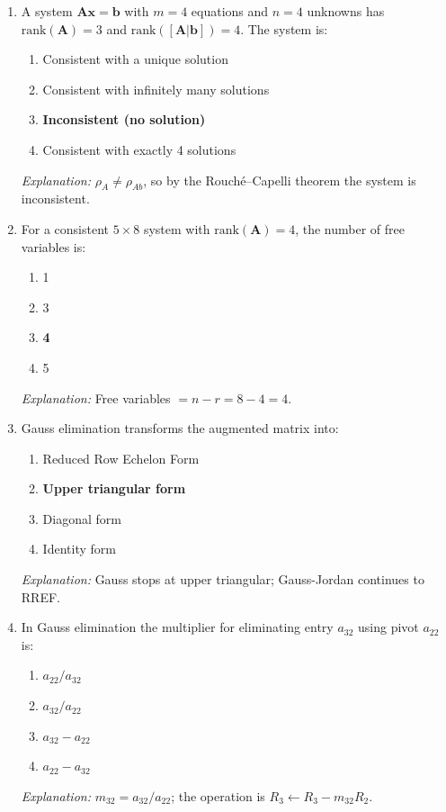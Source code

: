 \documentclass[12pt,a4paper]{article}
\begin{document}
\begin{enumerate}[leftmargin=2em, label=\textbf{MCQ\arabic*.}]
  \item A system $\mathbf{A}\mathbf{x} = \mathbf{b}$ with $m = 4$ equations and $n = 4$ unknowns has
        $\text{rank}(\mathbf{A}) = 3$ and $\text{rank}([\mathbf{A}|\mathbf{b}]) = 4$. The system is:
        \begin{enumerate}[label=(\alph*)]
          \item Consistent with a unique solution
          \item Consistent with infinitely many solutions
          \item \textbf{Inconsistent (no solution)}
          \item Consistent with exactly 4 solutions
        \end{enumerate}
        \textit{Explanation:} $\rho_A \neq \rho_{Ab}$, so by the Rouch\'{e}--Capelli theorem the system is inconsistent.

  \item For a consistent $5 \times 8$ system with $\text{rank}(\mathbf{A}) = 4$, the number of free variables is:
        \begin{enumerate}[label=(\alph*)]
          \item 1
          \item 3
          \item \textbf{4}
          \item 5
        \end{enumerate}
        \textit{Explanation:} Free variables $= n - r = 8 - 4 = 4$.

  \item Gauss elimination transforms the augmented matrix into:
        \begin{enumerate}[label=(\alph*)]
          \item Reduced Row Echelon Form
          \item \textbf{Upper triangular form}
          \item Diagonal form
          \item Identity form
        \end{enumerate}
        \textit{Explanation:} Gauss stops at upper triangular; Gauss-Jordan continues to RREF.

  \item In Gauss elimination the multiplier for eliminating entry $a_{32}$ using pivot $a_{22}$ is:
        \begin{enumerate}[label=(\alph*)]
          \item $a_{22}/a_{32}$
          \item \textbf{$a_{32}/a_{22}$}
          \item $a_{32} - a_{22}$
          \item $a_{22} - a_{32}$
        \end{enumerate}
        \textit{Explanation:} $m_{32} = a_{32}/a_{22}$; the operation is $R_3 \leftarrow R_3 - m_{32}R_2$.


\end{enumerate}
\end{document}
